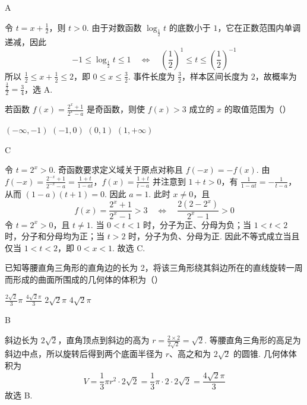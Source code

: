 \begin{answer}
A
\end{answer}

\begin{solution}
令 \(t=x+\frac12\)，则 \(t>0\). 由于对数函数 \(\log_{\frac{1}{2}}t\) 的底数小于 \(1\)，它在正数范围内单调递减，因此
\[
-1\leqslant\log_{\frac{1}{2}}t\leqslant1
\quad\Longleftrightarrow\quad
\left(\frac12\right)^1\leqslant t\leqslant\left(\frac12\right)^{-1}
\]
所以 \(\frac12\leqslant x+\frac12\leqslant2\)，即 \(0\leqslant x\leqslant\frac32\). 事件长度为 \(\frac32\)，样本区间长度为 \(2\)，故概率为 \(\frac{\frac{3}{2}}{2}=\frac34\)，选 A.
\end{solution}

\begin{problem}
若函数 \( f(x) = \frac{2^x + 1}{2^x - a} \) 是奇函数，则使 \( f(x) > 3 \) 成立的 \( x \) 的取值范围为（\quad）

\choices
    {\((- \infty, -1)\)}
    {\((-1,0)\)}
    {\((0,1)\)}
    {\((1, + \infty)\)}
\end{problem}

\begin{answer}
C
\end{answer}

\begin{solution}
令 \(t=2^x>0\). 奇函数要求定义域关于原点对称且 \(f(-x)=-f(x)\). 由
\(f(-x)=\frac{2^{-x}+1}{2^{-x}-a}=\frac{1+t}{1-at}\)，\(f(x)=\frac{1+t}{t-a}\)
并注意到 \(1+t>0\)，有 \(\frac{1}{1-at}=-\frac{1}{t-a}\)，从而
\((1-a)(t+1)=0\). 因此 \(a=1\). 此时 \(x\neq0\)，且
\[
f(x)=\frac{2^x+1}{2^x-1}>3
\quad\Longleftrightarrow\quad
\frac{2(2-2^x)}{2^x-1}>0
\]
令 \(t=2^x>0\)，且 \(t\ne1\). 当 \(0<t<1\) 时，分子为正、分母为负；当 \(1<t<2\) 时，分子和分母均为正；当 \(t>2\) 时，分子为负、分母为正. 因此不等式成立当且仅当 \(1<t<2\)，即 \(0<x<1\). 故选 C.
\end{solution}

\begin{problem}
已知等腰直角三角形的直角边的长为 2，将该三角形绕其斜边所在的直线旋转一周而形成的曲面所围成的几何体的体积为（\quad）

\choices
    {\(\frac{2\sqrt{2}}{3}\pi\)}
    {\(\frac{4\sqrt{2}\pi}{3}\)}
    {\(2\sqrt{2}\pi\)}
    {\(4\sqrt{2}\pi\)}
\end{problem}

\begin{answer}
B
\end{answer}

\begin{solution}
斜边长为 \(2\sqrt2\)，直角顶点到斜边的高为
\(r=\frac{2\times2}{2\sqrt2}=\sqrt2\). 等腰直角三角形的高足为斜边中点，所以旋转后得到两个底面半径为 \(r\)、高之和为 \(2\sqrt2\) 的圆锥. 几何体体积为
\[
V=\frac13\pi r^2\cdot2\sqrt2
=\frac13\pi\cdot2\cdot2\sqrt2
=\frac{4\sqrt2\pi}{3}
\]
故选 B.
\end{solution}

